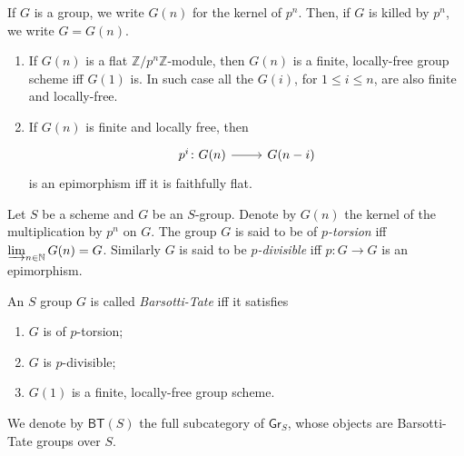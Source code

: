 \begin{defn}[]
	If $G$ is a group, we write $G(n)$ for the kernel of $p^n$.
	Then, if $G$ is killed by $p^n$, we write $G = G(n)$.
\end{defn}


\begin{lem}\label{FlatnessDescentTrBTGroup}\leavevmode\vspace{-.2\baselineskip}
\begin{enumerate}
	\item If $G(n)$ is a flat $\mathbb{Z}/p^n\mathbb{Z}$-module, then $G(n)$
		is a finite, locally-free group scheme iff
		$G(1)$ is. 
		In such case all the $G(i)$, for $1 \leq i \leq n$, are also finite and locally-free.

	\item If $G(n)$ is finite and locally free, then
		\begin{equation}
		\begin{tikzcd}[row sep = 0ex
			,/tikz/column 1/.append style={anchor=base east}
			,/tikz/column 2/.append style={anchor=base west}]
			p^i\colon G(n) \arrow[r, "", rightarrow] &
			G(n-i)
		\end{tikzcd}
		\end{equation} 
		is an epimorphism iff it is faithfully flat.
\end{enumerate}
\end{lem} 


\begin{defn}
	Let $S$ be a scheme and $G$ be an $S$-group.
	Denote by $G(n)$ the kernel of the multiplication by $p^n$ on $G$.
	The group $G$ is said to be of {\em $p$-torsion} iff $\varinjlim_{n \in \mathbb{N}} G(n) = G$.
	Similarly $G$ is said to be {\em $p$-divisible} iff $p\colon G \to G$
	is an epimorphism.
\end{defn}


\begin{defn}\label{BTGroup}
	An $S$ group $G$ is called {\em Barsotti-Tate} iff it satisfies
\begin{enumerate}
	\item $G$ is of $p$-torsion;
	\item $G$ is $p$-divisible;
	\item $G(1)$ is a finite, locally-free group scheme.
\end{enumerate}
	We denote by $\mathsf{BT}(S)$ the full subcategory of $\mathsf{Gr}_S$,
	whose objects are Barsotti-Tate groups over $S$.
\end{defn}


